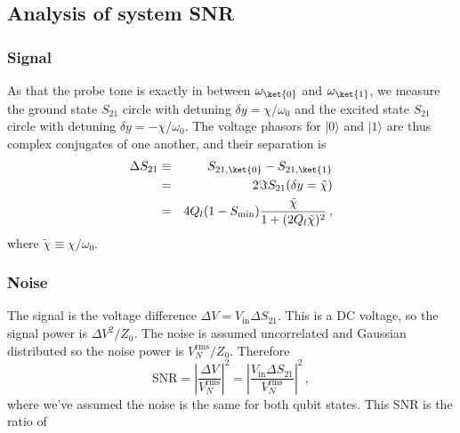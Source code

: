 \subsection{Analysis of system SNR}


\subsubsection{Signal}

As that the probe tone is exactly in between $\omega_{\ket{0}}$ and $\omega_{\ket{1}}$, we measure the ground state $S_{21}$ circle with detuning $\delta y = \chi/\omega_0$ and the excited state $S_{21}$ circle with detuning $\delta y = -\chi/\omega_0$.
The voltage phasors for $|0\rangle$ and $|1\rangle$ are thus complex conjugates of one another, and their separation is \begin{eqnarray}
\Delta S_{21} &\equiv& S_{21,\ket{0}} - S_{21,\ket{1}} \nonumber \\
&=& 2\Im S_{21}(\delta y = \tilde{\chi}) \nonumber \\
&=& 4Q_l (1-S_{\text{min}}) \frac{\tilde{\chi}}{1+(2Q_l \tilde{\chi})^2} \, , \end{eqnarray}
where $\tilde{\chi}\equiv \chi / \omega_0$.

\subsubsection{Noise}

The signal is the voltage difference \mbox{$\Delta V = V_{\textrm{in}}\Delta S_{21}$}. This is a DC voltage, so the signal power is \mbox{$\Delta V ^2 / Z_0$}. The noise is assumed uncorrelated and Gaussian distributed so the noise power is $V_N^{\textrm{rms}}/Z_0$. Therefore \begin{equation}
\textrm{SNR} = \left| \frac{\Delta V}{V_N^{\textrm{rms}}} \right|^2 = \left| \frac{V_{\textrm{in}}\Delta S_{21}}{V_N^{\textrm{rms}}} \right|^2 \nonumber \, , \end{equation}
where we've assumed the noise is the same for both qubit states. This SNR is the ratio of 


